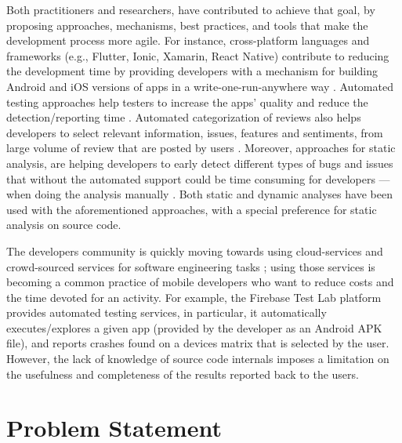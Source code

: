 Both practitioners and researchers, have contributed to achieve that goal, by proposing approaches, mechanisms, best practices, and tools that make the development process more agile. For instance, cross-platform languages and frameworks (e.g., Flutter, Ionic, Xamarin, React Native) contribute to reducing the development time by providing developers with a mechanism for building Android and iOS versions of apps in a write-one-run-anywhere way \cite{joorabchi2013real,fazzini2017automated}. Automated testing approaches help testers to increase the apps' quality and reduce the detection/reporting time \cite{choudhary2015automated,kochhar2015understanding,linares2017continuous}. 
Automated categorization of reviews also helps developers to select relevant information, issues, features and sentiments, from large volume of review that are posted by users \cite{palomba2018crowdsourcing,villarroel2016release,di2016would}. Moreover, approaches for static analysis, are helping developers to early detect different types of bugs and issues that without the automated support could be time consuming for developers --- when doing the analysis manually \cite{li:IST2017}. 
Both static and dynamic analyses have been used with the aforementioned approaches, with a special preference for static analysis on source code.  

The developers community is quickly moving towards using cloud-services and crowd-sourced services for software engineering tasks \cite{Leicht2017IEEESoftware, stol2017crowdsourcing}; using those services is becoming a common practice of mobile developers who want to reduce costs and the time devoted for an activity. For example, the Firebase Test Lab platform \cite{firebase} provides automated testing services, in particular, it automatically executes/explores a given app (provided by the developer as an Android APK file), and reports crashes found on a devices matrix that is selected by the user. However, the lack of knowledge of source code internals imposes a limitation on the usefulness and completeness of the results reported back to the users.


\section{Problem Statement}

